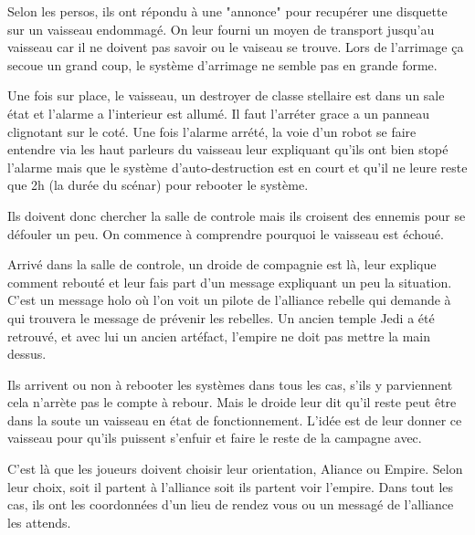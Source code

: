 Selon les persos, ils ont répondu à une "annonce" pour recupérer une disquette sur un vaisseau endommagé. On leur fourni un moyen de transport jusqu'au vaisseau car il ne doivent pas savoir ou le vaiseau se trouve. Lors de l'arrimage ça secoue un grand coup, le système d'arrimage ne semble pas en grande forme.

Une fois sur place, le vaisseau, un destroyer de classe stellaire est dans un sale état et l'alarme a l'interieur est allumé. Il faut l'arréter grace a un panneau clignotant sur le coté. Une fois l'alarme arrété, la voie d'un robot se faire entendre via les haut parleurs du vaisseau leur expliquant qu'ils ont bien stopé l'alarme mais que le système d'auto-destruction est en court et qu'il ne leure reste que 2h (la durée du scénar) pour rebooter le système.

Ils doivent donc chercher la salle de controle mais ils croisent des ennemis pour se défouler un peu. On commence à comprendre pourquoi le vaisseau est échoué.

Arrivé dans la salle de controle, un droide de compagnie est là, leur explique comment rebouté et leur fais part d'un message expliquant un peu la situation. C'est un message holo où l'on voit un pilote de l'alliance rebelle qui demande à qui trouvera le message de prévenir les rebelles. Un ancien temple Jedi a été retrouvé, et avec lui un ancien artéfact, l'empire ne doit pas mettre la main dessus.

Ils arrivent ou non à rebooter les systèmes dans tous les cas, s'ils y parviennent cela n'arrète pas le compte à rebour. Mais le droide leur dit qu'il reste peut être dans la soute un vaisseau en état de fonctionnement. L'idée est de leur donner ce vaisseau pour qu'ils puissent s'enfuir et faire le reste de la campagne avec.

C'est là que les joueurs doivent choisir leur orientation, Aliance ou Empire. Selon leur choix, soit il partent à l'alliance soit ils partent voir l'empire. Dans tout les cas, ils ont les coordonnées d'un lieu de rendez vous ou un messagé de l'alliance les attends.

